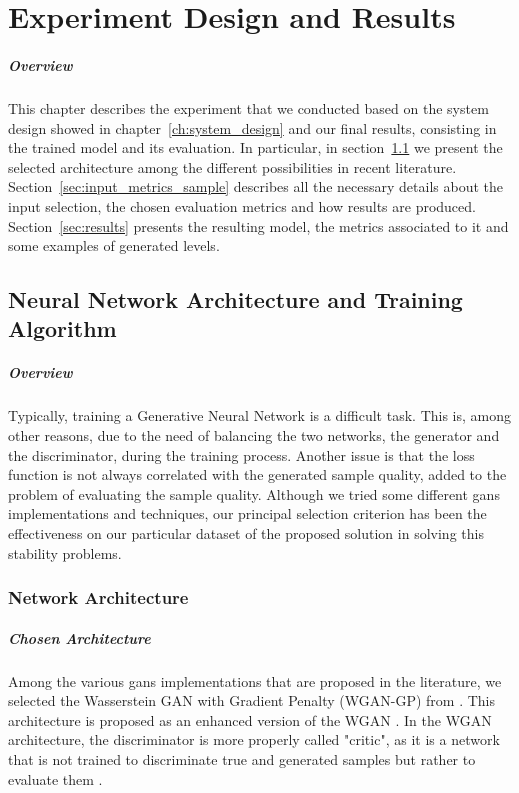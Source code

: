 \chapter{Experiment Design and Results}
\paragraph{Overview} %
 This chapter describes the experiment that we conducted based on the system design showed in chapter~\ref{ch:system_design} and our final results, consisting in the trained model and its evaluation. In particular, in section~\ref{sec:nn} we present the selected architecture among the different possibilities in recent literature. Section~\ref{sec:input_metrics_sample} describes all the necessary details about the input selection, the chosen evaluation metrics and how results are produced. Section~\ref{sec:results} presents the resulting model, the metrics associated to it and some examples of generated levels. 
\section{Neural Network Architecture and Training Algorithm}
\label{sec:nn}
\paragraph{Overview} Typically, training a Generative Neural Network is a difficult task. This is, among other reasons, due to the need of balancing the two networks, the generator and the discriminator, during the training process. Another issue is that the loss function is not always correlated with the generated sample quality, added to the problem of evaluating the sample quality. %
 Although we tried some different \glspl{gan} implementations and techniques, our principal selection criterion has been the effectiveness on our particular dataset of the proposed solution in solving this stability problems.
\subsection{Network Architecture}
\label{sec:networkarch}

\paragraph{Chosen Architecture} Among the various \glspl{gan} implementations that are proposed in the literature, we selected the Wasserstein GAN with Gradient Penalty \cite{wgangp} (WGAN-GP) from \citeauthor{wgangp}. This architecture is proposed as an enhanced version of the WGAN \cite{wgan}. In the WGAN architecture, the discriminator is more properly called "critic", as it is a network that is not trained to discriminate true and generated samples but rather to evaluate them \cite[section 2.2, p.~2]{wgangp}.



